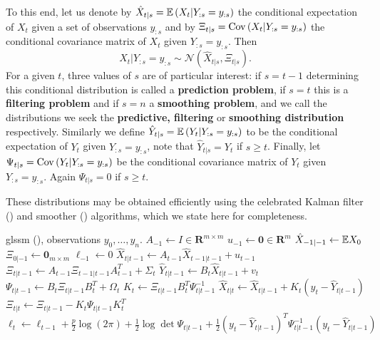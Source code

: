 To this end, let us denote by $\hat X_{t | s} = \mathbb E \left( X_{t} | Y_{:s} = y_{:s}\right)$ the conditional expectation of $X_{t}$ given a set of observations $y_{:s}$ and by $\Xi_{t | s} = \operatorname{Cov} \left( X_{t} | Y_{:s} = y_{:s} \right)$ the conditional covariance matrix of $X_{t}$ given $Y_{:s} = y_{:s}$. Then $$X_{t} | Y_{:s} = y_{:s} \sim \mathcal N \left( \hat X_{t|s}, \Xi_{t|s} \right).$$ For a given $t$, three values of $s$ are of particular interest: if $s = t - 1$ determining this conditional distribution is called a \textbf{prediction problem}, if $s = t$ this is a \textbf{filtering problem} and if $s = n$ a \textbf{smoothing problem}, and we call the distributions we seek the \textbf{predictive, filtering} or \textbf{smoothing distribution} respectively. 
Similarly we define $\hat Y_{t|s} = \mathbb E \left( Y_{t} \middle| Y_{:s} = y_{:s} \right)$ to be the conditional expectation of $Y_{t}$ given $Y_{:s}=y_{:s}$, note that $\hat Y_{t|s} = Y_{t}$ if $s \geq t$. Finally, let $\Psi_{t|s} = \operatorname{Cov} \left( Y_{t} | Y_{:s} = y_{:s} \right)$ be the conditional covariance matrix of $Y_{t}$ given $Y_{:s} = y_{:s}$. Again $\Psi_{t|s} = 0$ if $s \geq t$. 

These distributions may be obtained efficiently using the celebrated Kalman filter () and smoother () algorithms, which we state here for completeness.

\begin{algorithm}
    \caption{Kalman filter, with runtime $\mathcal O(n(m^{2} + p^{3}))$}
    \label{alg:kalman_filter}
    \begin{algorithmic}[1]
        \Require \gls{glssm} (), observations $y_{0}, \dots, y_{n}$.
        \State $A_{-1} \gets I \in \mathbf R^{m\times m}$ 
        \State $u_{-1} \gets \mathbf 0 \in \mathbf R^{m}$ 
        \State $\hat X_{-1|-1} \gets \mathbb E X_0$
        \State $\Xi_{0|-1} \gets \mathbf 0_{m\times m}$
        \State $\ell_{-1} \gets 0$
            \State\label{step:kf_loop}$\hat X_{t| t - 1} \gets A_{t-1} \hat X_{t-1|t-1} + u_{t-1}$ 
            \State $\Xi_{t | t - 1} \gets A_{t - 1} \Xi_{t - 1 | t - 1 } A_{t - 1}^{T} + \Sigma_{t}$ 
            \State $\hat Y_{t|t - 1} \gets B_{t}\hat X_{t | t - 1} + v_{t}$
            \State $\Psi_{t|t - 1} \gets B_{t}\Xi_{t | t - 1} B_{t}^T + \Omega_{t}$
            \State $K_t \gets \Xi_{t | t - 1} B_{t}^T \Psi_{t | t - 1} ^{-1}$ 
            \State $\hat X_{t | t} \gets \hat X_{t | t - 1} + K_t (y_{t} - \hat Y_{t | t - 1})$
            \State $\Xi_{t| t } \gets \Xi_{t | t - 1} - K_t \Psi_{t| t - 1} K_t^T$
            \State $\ell_{t} \gets \ell_{t - 1} + \frac{p}{2} \log (2\pi) + \frac{1}{2}\log\det \Psi_{t|t -1} + \frac{1}{2} \left( y_{t} - \hat Y_{t | t - 1} \right)^{T} \Psi_{t|t-1}^{-1} \left( y_{t} - \hat Y_{t | t - 1} \right) $ 
        \EndFor
    \end{algorithmic}
\end{algorithm}

